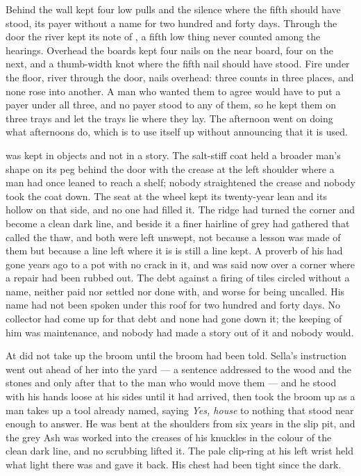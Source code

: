 Behind the wall  kept four low pulls and the silence where the fifth should have stood, its payer without a name for two hundred and forty days. Through the door the river kept its note of , a fifth low thing never counted among the hearings. Overhead the boards kept four nails on the near board, four on the next, and a thumb-width knot where the fifth nail should have stood. Fire under the floor, river through the door, nails overhead: three counts in three places, and none rose into another. A man who wanted them to agree would have to put a payer under all three, and no payer stood to any of them, so he kept them on three trays and let the trays lie where they lay. The afternoon went on doing what afternoons do, which is to use itself up without announcing that it is used.

 was kept in objects and not in a story. The salt-stiff coat held a broader man's shape on its peg behind the door with the crease at the left shoulder where a man had once leaned to reach a shelf; nobody straightened the crease and nobody took the coat down. The seat at the wheel kept its twenty-year lean and its hollow on that side, and no one had filled it. The  ridge had turned the corner and become a clean dark line, and beside it a finer hairline of grey had gathered that  called the thaw, and both were left unswept, not because a lesson was made of them but because a line left where it is is still a line kept. A proverb of his had gone years ago to a pot with no crack in it, and was said now over a corner where a repair had been rubbed out. The debt against a firing of tiles circled without a name, neither paid nor settled nor done with, and worse for being uncalled. His name had not been spoken under this roof for two hundred and forty days. No collector had come up  for that debt and none had gone down it; the keeping of him was maintenance, and nobody had made a story out of it and nobody would.

\scenebreak

At   did not take up the broom until the broom had been told. Sella's instruction went out ahead of her into the yard --- a sentence addressed to the wood and the stones and only after that to the man who would move them --- and he stood with his hands loose at his sides until it had arrived, then took the broom up as a man takes up a tool already named, saying \emph{Yes, house} to nothing that stood near enough to answer. He was bent at the shoulders from six years in the slip pit, and the grey Ash was worked into the creases of his knuckles in the colour of the clean dark line, and no scrubbing lifted it. The pale clip-ring at his left wrist held what light there was and gave it back. His chest had been tight since the dark.

